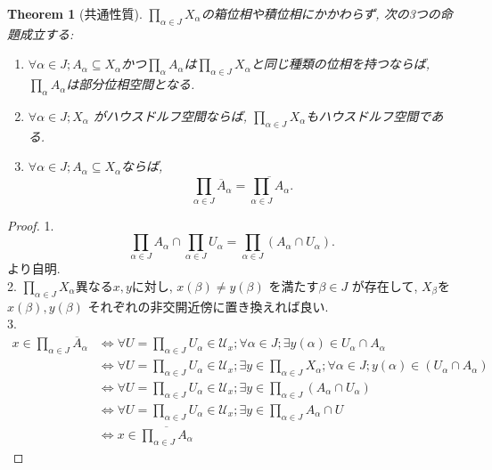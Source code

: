 \documentclass[dvipdfmx]{jbook}
\newcommand{\cl}[1]{\overline{ #1}  }
\newtheorem{theorem}{Theorem}[section]
\theoremstyle{remark}
\theoremstyle{plain}
\begin{document}
\begin{theorem}[共通性質]
	$\prod_{\alpha \in J} X_{\alpha}  $の箱位相や積位相にかかわらず, 次の3つの命題成立する:
	\begin{enumerate}
		\item $\forall \alpha \in J; A_{\alpha} \subseteq X_{\alpha} $かつ$\prod_{\alpha} A_{\alpha}  $は$\prod_{\alpha \in J} X_{\alpha}  $と同じ種類の位相を持つならば, $\prod_{\alpha} A_{\alpha}  $は部分位相空間となる.
		\item $\forall \alpha \in J; X_{\alpha}$ がハウスドルフ空間ならば, $\prod_{\alpha \in J} X_{\alpha}  $もハウスドルフ空間である.
		\item $\forall \alpha \in J; A_{\alpha} \subseteq X_{\alpha}$ならば, 
			\[
			\prod_{\alpha \in J} \cl{A}_{\alpha} = \cl{\prod_{\alpha \in J} A_{\alpha}}    
			.\] 
	\end{enumerate}
\end{theorem}

\begin{proof}
	1.\[
\prod_{\alpha \in J} A_{\alpha}  \cap \prod_{\alpha \in J} U_{\alpha}  = \prod_{\alpha \in J}\left( A_{\alpha}  \cap U_{\alpha}	\right)
	.\] より自明.\\
	2. $\prod_{\alpha \in J} X_{\alpha}  $異なる$x,y$に対し, $x(\beta) \neq y(\beta)$ を満たす$\beta \in J$ が存在して, 
	$X_{\beta}$を $x\left( \beta \right) , y\left( \beta \right) $ それぞれの非交開近傍に置き換えれば良い.\\
	3. 
	$$
	\begin{aligned}
		x \in \prod_{\alpha \in J} \cl{A}_{\alpha} & \iff \forall U = \prod_{\alpha \in J} U_{\alpha}   \in \mathcal{U}_x; \forall \alpha \in J ; \exists y(\alpha) \in U_{\alpha} \cap A_{\alpha}\\
   &\iff \forall U = \prod_{\alpha \in J} U_{\alpha} \in \mathcal{U}_x; \exists y \in \prod_{\alpha \in J} X_{\alpha}  ; \forall \alpha \in J; y(\alpha) \in \left( U_{\alpha} \cap  A_{\alpha} \right) \\
   &\iff \forall  U = \prod_{\alpha \in J} U_{\alpha} \in \mathcal{U}_x; \exists y \in \prod_{\alpha \in J} (A_{\alpha} \cap U_{\alpha}) \\
   &\iff \forall U = \prod_{\alpha \in J} U_{\alpha} \in \mathcal{U}_x; \exists y \in \prod_{\alpha \in J} A_{\alpha} \cap U \\
   &   \iff x \in \cl{\prod_{\alpha \in J} A_{\alpha}  }
	\end{aligned}
	$$

\end{proof}
\end{document}
